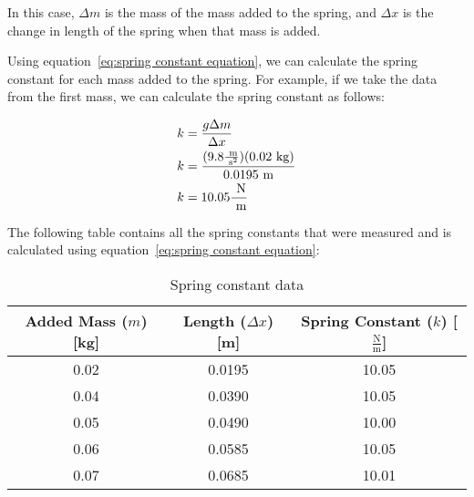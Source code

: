 \documentclass[titlepage]{article}
\begin{document}
            
            In this case, $\Delta m$ is the mass of the mass added to the spring, and $\Delta x$ is the change in length of the spring when that mass is added.
            
            Using equation~\ref{eq:spring constant equation}, we can calculate the spring constant for each mass added to the spring.
            For example, if we take the data from the first mass, we can calculate the spring constant as follows:
            
            \begin{equation}
                \begin{aligned}
                    \small
                    \notag
                    k &= \frac{g \Delta m}{\Delta x} \\
                    k &= \frac{(9.8 \frac{\text{ m}}{\text{ s}^2})(0.02 \text{ kg})}{0.0195 \text{ m}} \\
                    k &= 10.05 \frac{\text{ N}}{\text{ m}} \\
                \end{aligned}\label{eq:example spring constant equation}
            \end{equation}
            
            The following table contains all the spring constants that were measured and is calculated using equation~\ref{eq:spring constant equation}:
            
            \begin{table}[H]
                \centering
                \small
                \begin{tabular}{|c|c|c|}
                    \hline
                    Added Mass ($m$) [kg] & Length ($\Delta x$) [m] & Spring Constant ($k$) [$\frac{\text{N}}{\text{m}}$] \\
                    \hline
                    0.02                  & 0.0195                  & 10.05                                               \\
                    \hline
                    0.04                  & 0.0390                  & 10.05                                               \\
                    \hline
                    0.05                  & 0.0490                  & 10.00                                               \\
                    \hline
                    0.06                  & 0.0585                  & 10.05                                               \\
                    \hline
                    0.07                  & 0.0685                  & 10.01                                               \\
                    \hline
                \end{tabular}
                \caption{Spring constant data}\label{tab:spring-constant-data}
            \end{table}
            
\end{document}
